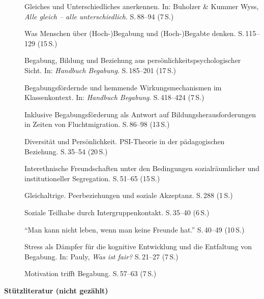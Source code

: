 \documentclass[ngerman, a4paper]{article}
\begin{document}
\begin{description}
  \item[\cite{grossrieder2010anerkennung}] Gleiches und Unterschiedliches
        anerkennen. In: Buholzer \& Kummer Wyss,
        \textit{Alle gleich -- alle unterschiedlich}. S.\,88--94 (7\,S.)
  \item[\cite{baudson2021wasdenken}] Was Menschen über
        (Hoch-)Begabung und (Hoch-)Begabte denken. S.\,115--129 (15\,S.)
  \item[\cite{kuhl2021begabungbildungbeziehung}] Begabung, Bildung
        und Beziehung aus persönlichkeitspsychologischer Sicht.
        In: \textit{Handbuch Begabung}.
        S.\,185--201 (17\,S.)
  \item[\cite{wagener2021bfhemmendfoerdernd}] Begabungsfördernde und
        hemmende Wirkungsmechanismen im Klassenkontext.
        In: \textit{Handbuch Begabung}.
        S.\,418--424 (7\,S.)
  \item[\cite{behrensen2019inklusive}] Inklusive Begabungsförderung als Antwort
        auf Bildungsherausforderungen in Zeiten von Fluchtmigration.
        S.\,86--98 (13\,S.)
  \item[\cite{kuhl2019diversitaet}] Diversität und Persönlichkeit.
        PSI-Theorie in der pädagogischen Beziehung. S.\,35--54 (20\,S.)
  \item[\cite{boosnuenning2022interethnisch}] Interethnische Freundschaften
        unter den Bedingungen sozialräumlicher und institutioneller Segregation.
        S.\,51--65 (15\,S.)
  \item[\cite{kesselshannover2015gleichaltrige}] Gleichaltrige.
        Peerbeziehungen und soziale Akzeptanz. S.\,288 (1\,S.)
  \item[\cite{tschoppbuholzergruetter2022intergruppenkontakt}]
        Soziale Teilhabe durch Intergruppenkontakt. S.\,35--40 (6\,S.)
  \item[\cite{baumert2022freundschaftwerte}] \enquote{Man kann nicht leben,
          wenn man keine Freunde hat.} S.\,40--49 (10\,S.)
  \item[\cite{evers2025stress}] Stress als Dämpfer für die kognitive
        Entwicklung und die Entfaltung von Begabung.
        In: Pauly, \textit{Was ist fair?} S.\,21--27 (7\,S.)
  \item[\cite{lehwald2017motivation}] Motivation trifft Begabung.
        S.\,57--63 (7\,S.)
\end{description}

\textbf{Stützliteratur (nicht gezählt)}
\end{document}
